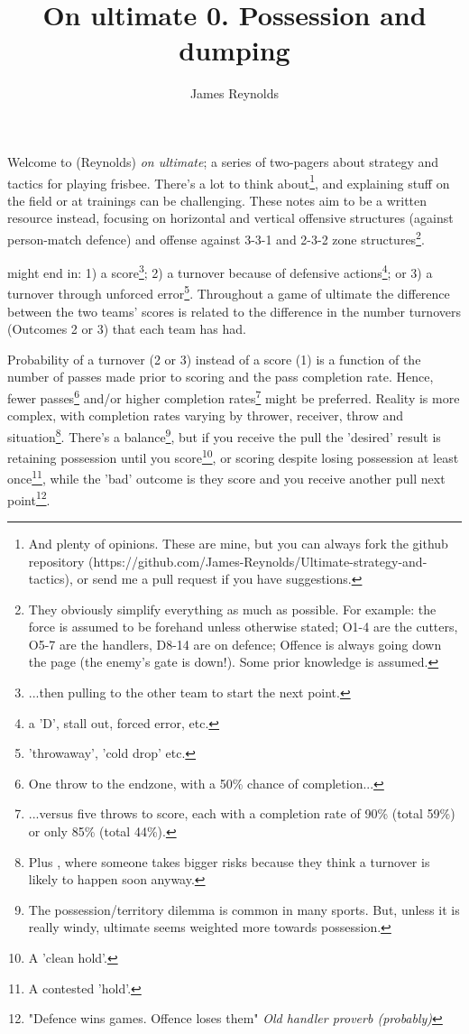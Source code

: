 \documentclass{tufte-handout}
\title{On ultimate 0. Possession and dumping}
\author[James Reynolds]{James Reynolds}
\begin{document}
\maketitle%


Welcome to (Reynolds) \emph{on ultimate};  
a series of two-pagers 
about strategy and tactics for playing frisbee. 
There's a lot to think about\footnote{And plenty of opinions. 
These are mine, but you can always fork the github repository 
(https://github.com/James-Reynolds/Ultimate-strategy-and-tactics), 
or send me a pull request if you have suggestions.}, 
and explaining stuff
on the field or at trainings
can be challenging.  
These notes 
aim to be a written resource 
instead, focusing on horizontal and vertical offensive structures 
(against person-match defence) 
and offense against 3-3-1 and 2-3-2 zone structures\footnote{They obviously simplify everything as much as possible.
For example: the force is assumed to be forehand unless otherwise stated;  
O1-4 are the cutters, O5-7 are the handlers, D8-14 are on defence; 
Offence is always going down the page (the enemy's gate is down!). Some prior knowledge is assumed.}. 



might end in: 1) a score\footnote{...then pulling to the other team to start the next point.};  
2) a turnover because of defensive actions\footnote{a 'D', stall out, forced error, etc.}; or 
3) a turnover through unforced error\footnote{'throwaway', 'cold drop' etc.}.
Throughout a game of ultimate 
the difference between the two teams' scores 
is related to the difference 
in the number turnovers (Outcomes 2 or 3) that each team has had. 

Probability of a turnover (2 or 3) 
instead of a score (1)
is a function of 
the number of passes made 
prior to scoring 
and the pass completion rate.
Hence, fewer passes\footnote{
One throw to the endzone, with a 50\% chance of completion...} 
and/or higher completion rates\footnote{
...versus five throws
to score, 
each with a completion rate of 90\% 
(total 59\%) or only 85\%  
(total 44\%).}  
might be preferred. 
Reality is more complex, 
with
completion rates 
varying by 
thrower, 
receiver, 
throw 
and situation\footnote{Plus 
,  
where someone takes bigger risks 
because they think a turnover is 
likely to happen soon anyway.}.
There's a balance\footnote{The possession/territory
dilemma is common in many sports. 
But, unless it is really windy,
ultimate seems weighted 
more towards possession.}, 
 but if you receive the pull 
 the 'desired' result is  
 retaining possession until you
 score\footnote{A 'clean hold'.}, 
 or scoring despite 
 losing possession at least once\footnote{A contested 'hold'.}, while the 'bad' outcome  
 is they score and you receive another pull next point\footnote{"Defence wins games. Offence loses them" \emph{Old handler proverb (probably)}}.
\end{document}
